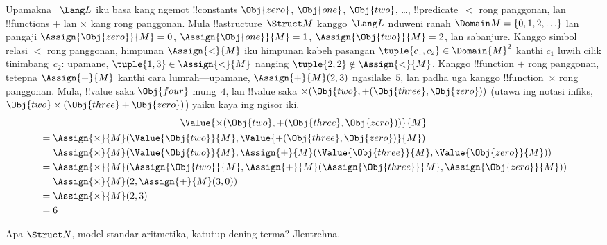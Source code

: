 \documentclass[../../../include/open-logic-section]{subfiles}
\begin{document}
\begin{ex}
Upamakna ~$\Lang L$ iku basa kang ngemot !!{constant}s $\Obj{zero}$,
$\Obj{one}$, $\Obj{two}$, \dots, !!{predicate}~$<$ rong panggonan,
lan !!{function}s $+$ lan $\times$ kang rong panggonan. Mula
!!a{structure}~$\Struct M$ kanggo~$\Lang L$ nduweni ranah
$\Domain M = \{0, 1, 2, \ldots \}$ lan pangaji
$\Assign{\Obj{zero}}{M} = 0$, $\Assign{\Obj{one}}{M} = 1$,
$\Assign{\Obj{two}}{M} = 2$, lan sabanjure. Kanggo simbol relasi
$<$ rong panggonan, himpunan $\Assign{<}{M}$ iku himpunan kabeh
pasangan $\tuple{c_1, c_2} \in \Domain{M}^2$ kanthi $c_1$
luwih cilik tinimbang~$c_2$: upamane, $\tuple{1, 3} \in
\Assign{<}{M}$ nanging $\tuple{2, 2} \notin \Assign{<}{M}$.
Kanggo !!{function} $+$ rong panggonan, tetepna $\Assign{+}{M}$
kanthi cara lumrah---upamane, $\Assign{+}{M}(2,3)$ ngasilake~$5$,
lan padha uga kanggo !!{function}~$\times$ rong panggonan.
Mula, !!{value} saka $\Obj{four}$ mung~$4$, lan !!{value}
saka $\times(\Obj{two},
+(\Obj{three},\Obj{zero}))$ (utawa ing notasi infiks,
$\Obj{two} \times (\Obj{three} + \Obj{zero})$) yaiku
kaya ing ngisor iki.
\begin{multline*}
\Value{\times(\Obj{two}, +(\Obj{three},\Obj{zero}))}{M} \\
\begin{aligned}
& =\Assign{\times}{M}(\Value{\Obj{two}}{M}, \Value{+(\Obj{three}, \Obj{zero})}{M})\\
& = \Assign{\times}{M}(\Value{\Obj{two}}{M}, \Assign{+}{M}(\Value{\Obj{three}}{M},
\Value{\Obj{zero}}{M})) \\
& = \Assign{\times}{M}(\Assign{\Obj{two}}{M}, \Assign{+}{M}(\Assign{\Obj{three}}{M},
\Assign{\Obj{zero}}{M})) \\
& = \Assign{\times}{M}(2, \Assign{+}{M}(3, 0)) \\
& = \Assign{\times}{M}(2, 3) \\
& = 6
\end{aligned}
\end{multline*}
\end{ex}

\begin{prob}
Apa $\Struct N$, model standar aritmetika, katutup dening terma? Jlentrehna.
\end{prob}
\end{document}
